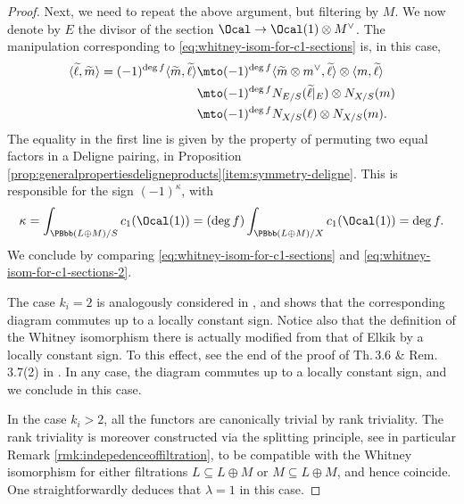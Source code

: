 \begin{proof}
Next, we need to repeat the above argument, but filtering by $M$. We now denote by $E$ the divisor of the section $\Ocal\to \Ocal(1)\otimes M^{\vee}$. The manipulation corresponding to \eqref{eq:whitney-isom-for-c1-sections} is, in this case,
\begin{equation}\label{eq:whitney-isom-for-c1-sections-2}
\begin{split}
\langle\widetilde{\ell},\widetilde{m}\rangle=(-1)^{\deg f}\langle\widetilde{m},\widetilde{\ell}\rangle &\mto (-1)^{\deg f}\langle\widetilde{m}\otimes m^{\vee},\widetilde{\ell}\rangle\otimes \langle m,\widetilde{\ell}\rangle\\
&\mto (-1)^{\deg f}N_{E/S}(\widetilde{\ell}|_{E})\otimes N_{X/S}(m)\\
&\mto (-1)^{\deg f}N_{X/S}(\ell)\otimes N_{X/S}(m).
\end{split}
\end{equation}
The equality in the first line is given by the property of permuting two equal factors in a Deligne pairing, in Proposition \ref{prop:generalpropertiesdeligneproducts}\eqref{item:symmetry-deligne}. This is responsible for the sign $(-1)^{\kappa}$, with
\begin{displaymath}
\kappa=\int_{\PBbb(L\oplus M)/S}c_{1}(\Ocal(1))=(\deg f)\int_{\PBbb(L\oplus M)/X}c_{1}(\Ocal(1))=\deg f.
\end{displaymath}
We conclude by comparing \eqref{eq:whitney-isom-for-c1-sections} and \eqref{eq:whitney-isom-for-c1-sections-2}.

The case $k_i = 2 $ is analogously considered in \cite[Prop.\,3.9]{Eriksson-Freixas-Wentworth}, and shows that the corresponding diagram commutes up to a locally constant sign. Notice also that the definition of the Whitney isomorphism there is actually modified from that of Elkik by a locally constant sign. To this effect, see the end of the proof of Th.\,3.6 \& Rem.\,3.7(2) in \cite{Eriksson-Freixas-Wentworth}. In any case, the diagram commutes up to a locally constant sign, and we conclude in this case.

In the case $k_i > 2$, all the functors are canonically trivial by rank triviality. The rank triviality is moreover constructed via the splitting principle, see in particular Remark \ref{rmk:indepedenceoffiltration}, to be compatible with the Whitney isomorphism for either filtrations $L \subseteq L \oplus M$ or $M \subseteq L \oplus M$, and hence coincide. One straightforwardly deduces that $\lambda = 1$ in this case.
\end{proof}

